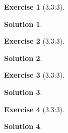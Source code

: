 \documentclass{article}
\theoremstyle{plain}
\newtheorem*{ex}{Exercise}
\theoremstyle{nonumberplain}
\newtheorem{sol}{Solution}
\begin{document}
\begin{ex}[3.3:3]
\end{ex}

\begin{sol}
\end{sol}

\begin{ex}[3.3:3]
\end{ex}

\begin{sol}
\end{sol}

\begin{ex}[3.3:3]
\end{ex}

\begin{sol}
\end{sol}

\begin{ex}[3.3:3]
\end{ex}

\begin{sol}
\end{sol}
\end{document}
